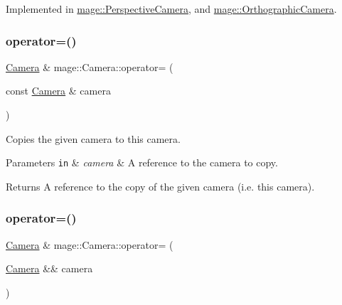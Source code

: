 Implemented in \hyperlink{classmage_1_1_perspective_camera_af2c74a3038563c1c0cda3f1525a814a3}{mage\+::\+Perspective\+Camera}, and \hyperlink{classmage_1_1_orthographic_camera_a970dc089a2463d74ae186884fa2b9b0c}{mage\+::\+Orthographic\+Camera}.

\hypertarget{classmage_1_1_camera_a9ae561f9cc0ed0dd855ee1d824dad090}{}\label{classmage_1_1_camera_a9ae561f9cc0ed0dd855ee1d824dad090} 
\subsubsection{\texorpdfstring{operator=()}{operator=()}\hspace{0.1cm}{\footnotesize\ttfamily [1/2]}}
{\footnotesize\ttfamily \hyperlink{classmage_1_1_camera}{Camera} \& mage\+::\+Camera\+::operator= (\begin{DoxyParamCaption}\item[{const \hyperlink{classmage_1_1_camera}{Camera} \&}]{camera }\end{DoxyParamCaption})\hspace{0.3cm}{\ttfamily [default]}}

Copies the given camera to this camera.


\begin{DoxyParams}[1]{Parameters}
\mbox{\tt in}  & {\em camera} & A reference to the camera to copy. \\
\hline
\end{DoxyParams}
\begin{DoxyReturn}{Returns}
A reference to the copy of the given camera (i.\+e. this camera). 
\end{DoxyReturn}
\hypertarget{classmage_1_1_camera_a83e33f57394e85eee58745eb8e05b282}{}\label{classmage_1_1_camera_a83e33f57394e85eee58745eb8e05b282} 
\subsubsection{\texorpdfstring{operator=()}{operator=()}\hspace{0.1cm}{\footnotesize\ttfamily [2/2]}}
{\footnotesize\ttfamily \hyperlink{classmage_1_1_camera}{Camera} \& mage\+::\+Camera\+::operator= (\begin{DoxyParamCaption}\item[{\hyperlink{classmage_1_1_camera}{Camera} \&\&}]{camera }\end{DoxyParamCaption})\hspace{0.3cm}{\ttfamily [default]}}

